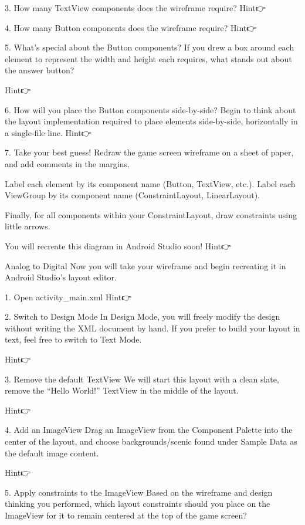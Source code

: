     3. How many TextView components does the wireframe require?
        Hint👉

    4. How many Button components does the wireframe require?
        Hint👉

    5. What’s special about the Button components?
        If you drew a box around each element to represent the width and height each requires, what stands out about the answer button?

        Hint👉

    6. How will you place the Button components side-by-side?
        Begin to think about the layout implementation required to place elements side-by-side, horizontally in a single-file line.
        Hint👉

    7. Take your best guess!
        Redraw the game screen wireframe on a sheet of paper, and add comments in the margins.

        Label each element by its component name (Button, TextView, etc.). Label each ViewGroup by its component name (ConstraintLayout, LinearLayout).

        Finally, for all components within your ConstraintLayout, draw constraints using little arrows.

        You will recreate this diagram in Android Studio soon!
        Hint👉

    Analog to Digital
        Now you will take your wireframe and begin recreating it in Android Studio’s layout editor.

        1. Open activity_main.xml
        Hint👉

    2. Switch to Design Mode
        In Design Mode, you will freely modify the design without writing the XML document by hand. If you prefer to build your layout in text, feel free to switch to Text Mode.

        Hint👉

    3. Remove the default TextView
        We will start this layout with a clean slate, remove the “Hello World!” TextView in the middle of the layout.

        Hint👉

    4. Add an ImageView
        Drag an ImageView from the Component Palette into the center of the layout, and choose backgrounds/scenic found under Sample Data as the default image content.

        Hint👉

    5. Apply constraints to the ImageView
        Based on the wireframe and design thinking you performed, which layout constraints should you place on the ImageView for it to remain centered at the top of the game screen?

